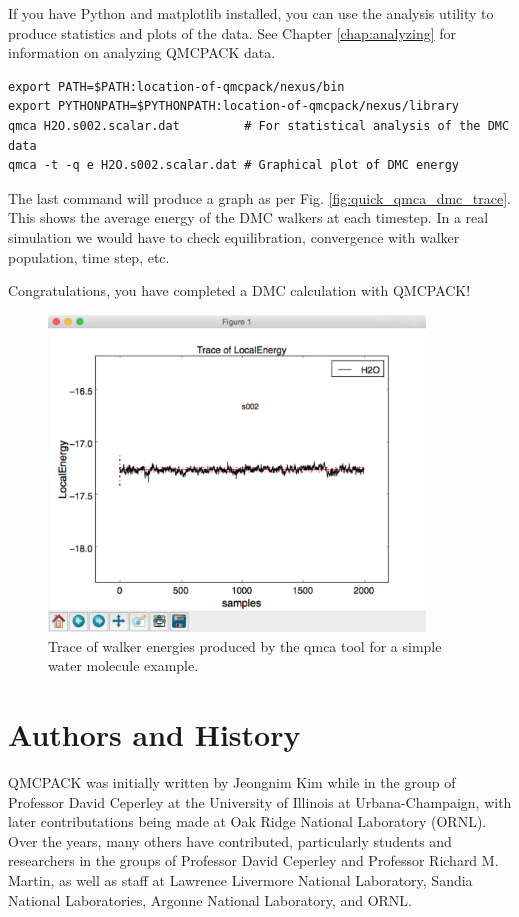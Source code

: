 If you have Python and matplotlib installed, you can use the
 analysis utility to produce statistics and plots of the
data. See Chapter \ref{chap:analyzing} for information on analyzing
QMCPACK data.
\begin{verbatim}
export PATH=$PATH:location-of-qmcpack/nexus/bin 
export PYTHONPATH=$PYTHONPATH:location-of-qmcpack/nexus/library
qmca H2O.s002.scalar.dat         # For statistical analysis of the DMC data
qmca -t -q e H2O.s002.scalar.dat # Graphical plot of DMC energy
\end{verbatim}

The last command will produce a graph as per
Fig. \ref{fig:quick_qmca_dmc_trace}. This shows the average energy of
the DMC walkers at each timestep. In a real simulation we would have
to check equilibration, convergence with walker population, time step, etc.

Congratulations, you have completed a DMC calculation with QMCPACK!

\begin{figure}
  \centering
  \includegraphics[width=10cm]{./figures/quick_qmca_dmc_trace.png}
  \caption{Trace of walker energies produced by the qmca tool for a simple
    water molecule example.}
  \label{fig:quick_qmca_dmc_tracej}
\end{figure}

\section{Authors and History}
\label{sec:history}
QMCPACK was initially written by Jeongnim Kim while in the group of
Professor David Ceperley at the University of Illinois at
Urbana-Champaign, with later contributations being made at Oak Ridge National Laboratory (ORNL). Over the years, many others have contributed, particularly
students and researchers in the groups of Professor David Ceperley
and Professor Richard M. Martin, as well as staff at Lawrence Livermore
National Laboratory, Sandia National Laboratories, Argonne National
Laboratory, and ORNL.

